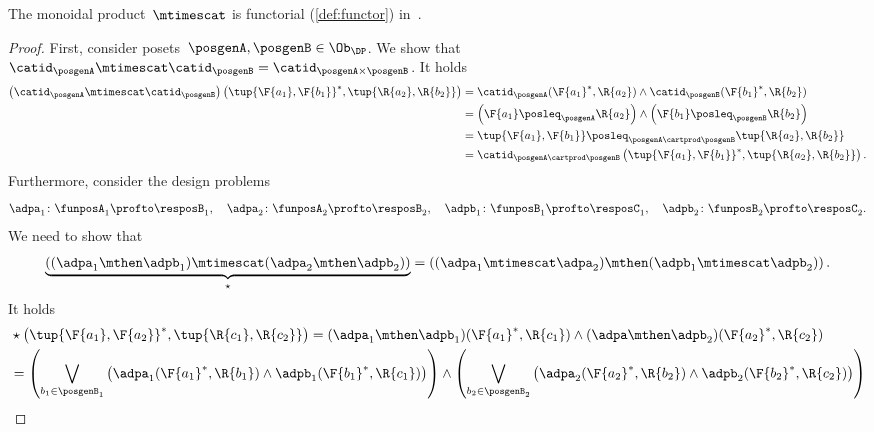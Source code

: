 \begin{lemma}
    \label{lem:monoidal_functorial}
    The monoidal product~$\mtimescat$ is functorial (\cref{def:functor}) in~\DP.
\end{lemma}
\begin{proof}
    First, consider posets~$\posgenA,\posgenB\in \Ob_\DP$.
    We show that~$\catid_\posgenA\mtimescat \catid_\posgenB = \catid_{\posgenA\times \posgenB}$.
    It holds
    \begin{equation}
        \begin{aligned}
            \left( \catid_{\posgenA}\mtimescat \catid_{\posgenB}\right)
            \left( \tup{\F{a_1},\F{b_1}}^*,\tup{\R{a_2},\R{b_2}}\right)&=
            \catid_\posgenA(\F{a_1}^*,\R{a_2})\wedge \catid_\posgenB(\F{b_1}^*,\R{b_2})\\
            &=\left( \F{a_1}\posleq_\posgenA \R{a_2}\right)\wedge \left( \F{b_1}\posleq_\posgenB \R{b_2}\right)\\
            &=\tup{\F{a_1},\F{b_1}}\posleq_{\posgenA\cartprod \posgenB}\tup{\R{a_2},\R{b_2}}\\
            &=\catid_{\posgenA\cartprod \posgenB}\left( \tup{\F{a_1},\F{b_1}}^*,\tup{\R{a_2},\R{b_2}}\right).
        \end{aligned}
    \end{equation}
    Furthermore, consider the design problems
    \begin{equation*}
        \adpa_1\colon \funposA_1 \profto \resposB_1,\quad \adpa_2\colon \funposA_2\profto \resposB_2, \quad \adpb_1\colon \funposB_1\profto \resposC_1,\quad \adpb_2\colon \funposB_2\profto \resposC_2.
    \end{equation*}
    We need to show that
    \begin{equation}
        \underbrace{\left( (\adpa_1\mthen \adpb_1) \mtimescat (\adpa_2\mthen \adpb_2)\right)}_{\star}=\left( (\adpa_1\mtimescat \adpa_2)\mthen (\adpb_1\mtimescat \adpb_2)\right).
    \end{equation}
    It holds
    \begin{equation}
        \begin{aligned}
            &\star \left( \tup{\F{a_1},\F{a_2}}^*,\tup{\R{c_1},\R{c_2}}\right)=(\adpa_1\mthen \adpb_1)(\F{a_1}^*,\R{c_1})\wedge (\adpa\mthen \adpb_2)(\F{a_2}^*,\R{c_2})\\
            &=\left(\bigvee_{b_1\in \posgenB_1}\left( \adpa_1(\F{a_1}^*,\R{b_1})\wedge \adpb_1(\F{b_1}^*,\R{c_1})\right)\right) \wedge\left(\bigvee_{b_2\in \posgenB_2}\left( \adpa_2(\F{a_2}^*,\R{b_2})\wedge \adpb_2(\F{b_2}^*,\R{c_2})\right)\right)\\

\end{aligned}
\end{equation}
\end{proof}
